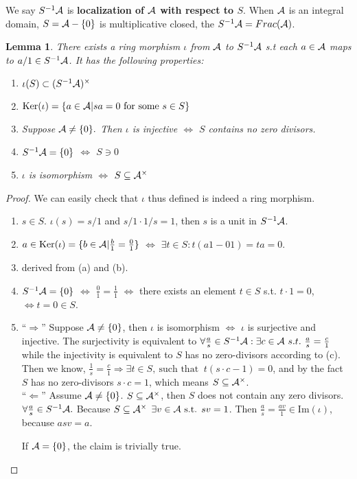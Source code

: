 \documentclass[11pt]{article}
\newtheorem{lemma}[thm]{Lemma}
\newcommand{\cala}{{\cal A}}
\newcommand{\Lrta}{\Longrightarrow}
\newcommand{\Llta}{\Longleftarrow}
\newcommand{\Llrta}{\Longleftrightarrow}
\begin{document}
We say $S^{-1}\cala$ is \textbf{localization of $\cala$ with respect to $S$}.
When $\cala$ is an integral domain, $S=\cala-\{0\}$ is multiplicative closed, the $S^{-1}\cala=Frac(\cala)$.
\begin{lemma}\label{lem:localization_inj_surj_iso}
There exists a ring morphism $\iota$ from $\cala$ to $S^{-1}\cala$ s.t each $a\in \cala$ maps to $a/1\in S^{-1}\cala$.
It has the following properties:
\begin{enumerate}[label=(\alph*)]
\item $\iota(S)\subset (S^{-1}\cala)^{\times}$
\item $\text{Ker}(\iota)=\{a\in \cala|sa=0 \text{ for some }s\in S\}$
\item Suppose $\cala\neq\{0\}.$ Then $\iota$ is injective $\Longleftrightarrow$ $S$ contains no zero divisors.
\item $S^{-1}\cala=\{0\}$ $\Longleftrightarrow$ $S\ni 0$
\item $\iota$ is isomorphism  $\Longleftrightarrow $ $S\subseteq \cala^{\times}$
\end{enumerate}
\end{lemma}
\begin{proof}We can easily check that $\iota$ thus defined is indeed a ring morphism.
\begin{enumerate}[label=(\alph*)]
\item  $s\in S$. $\iota(s)=s/1$ and $s/1\cdot 1/s=1$, then $s$ is a unit in $S^{-1}\cala$.
\item $a\in \text{Ker}(\iota)=\{b\in \cala|\frac{b}{1}=\frac{0}{1}\}$ $\Longleftrightarrow$ $\exists t\in S: t(a1-01)=ta=0.$
\item  derived from (a) and (b).
\item $S^{-1}\cala=\{0\}$ $\Longleftrightarrow$ $\frac{0}{1}=\frac{1}{1}$ $\Llrta$  there exists an element $t\in S$ s.t. $t\cdot1=0$, $\Longleftrightarrow t=0\in S$.
\item ``$\Lrta$'' Suppose $\cala\neq \{0\}$, then $\iota $ is isomorphism $\Llrta$  $\iota$ is surjective and injective. The surjectivity is equivalent to $\forall \frac{a}{s}\in S^{-1}\cala: \exists c\in \cala\ s.t.\ \frac{a}{s}=\frac{c}{1}$ while the injectivity is equivalent to $S$ has no zero-divisors  according to (c). Then we know, $\frac{1}{s}=\frac{c}{1}\Lrta\exists t\in S,\ \text{such that }\  t(s\cdot c-1)=0$, and by the fact $S$ has no zero-divisors  $s\cdot c=1$, which means $S\subseteq \cala^{\times}$.\\
``$\Llta$'' Assume $\cala\neq\{0\}$. $S\subseteq\cala^\times$, then $S$ does not contain any zero divisors. $\forall \frac{a}{s}\in S^{-1}\cala.$ Because $S\subseteq\cala^\times$ $ \exists v\in \cala \text{ s.t. } sv=1$. Then $ \frac{a}{s}=\frac{av}{1}\in \text{Im}(\iota)$, because $a s v=a$.

If $\cala=\{0\}$, the claim is trivially true.
\end{enumerate}
\end{proof}
\end{document}
